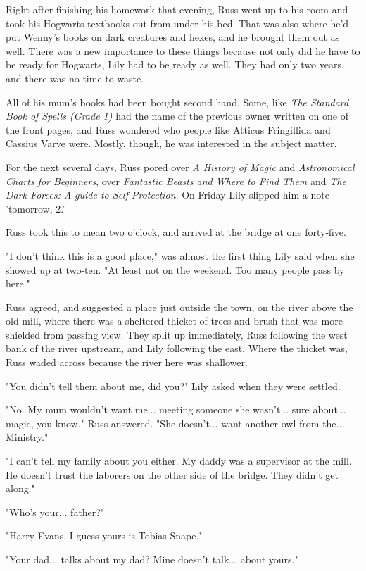 \documentclass[a4paper,11pt]{article}
\begin{document}
Right after finishing his homework that evening, Russ went up to his room and took his Hogwarts textbooks out from under his bed. That was also where he'd put Wenny's books on dark creatures and hexes, and he brought them out as well. There was a new importance to these things because not only did he have to be ready for Hogwarts, Lily had to be ready as well. They had only two years, and there was no time to waste.

All of his mum's books had been bought second hand. Some, like \emph{The Standard Book of Spells (Grade 1)} had the name of the previous owner written on one of the front pages, and Russ wondered who people like Atticus Fringillida and Cassius Varve were. Mostly, though, he was interested in the subject matter.

For the next several days, Russ pored over \emph{A History of Magic} and \emph{Astronomical Charts for Beginners}, over \emph{Fantastic Beasts and Where to Find Them} and \emph{The Dark Forces: A guide to Self-Protection}. On Friday Lily slipped him a note - 'tomorrow, 2.'

Russ took this to mean two o'clock, and arrived at the bridge at one forty-five.

"I don't think this is a good place," was almost the first thing Lily said when she showed up at two-ten. "At least not on the weekend. Too many people pass by here."

Russ agreed, and suggested a place just outside the town, on the river above the old mill, where there was a sheltered thicket of trees and brush that was more shielded from passing view. They split up immediately, Russ following the west bank of the river upstream, and Lily following the east. Where the thicket was, Russ waded across because the river here was shallower.

"You didn't tell them about me, did you?" Lily asked when they were settled.

"No. My mum wouldn't want me... meeting someone she wasn't... sure about... magic, you know." Russ answered. "She doesn't... want another owl from the... Ministry."

"I can't tell my family about you either. My daddy was a supervisor at the mill. He doesn't trust the laborers on the other side of the bridge. They didn't get along."

"Who's your... father?"

"Harry Evans. I guess yours is Tobias Snape."

"Your dad... talks about my dad? Mine doesn't talk... about yours."
\end{document}
